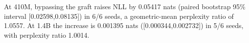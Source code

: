 At 410M, bypassing the graft raises NLL by 0.05417 nats (paired bootstrap 95\% interval [0.02598,0.08135]) in 6/6 seeds, a geometric-mean perplexity ratio of 1.0557. At 1.4B the increase is 0.001395 nats ([0.000344,0.002732]) in 5/6 seeds, with perplexity ratio 1.0014.

